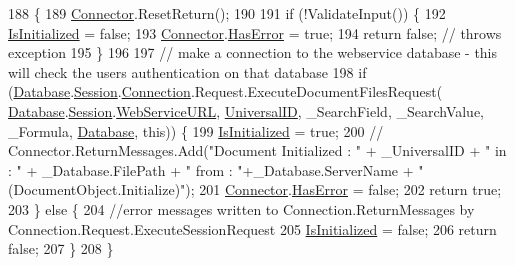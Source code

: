 \begin{DoxyCode}
188                                       \{
189         \mbox{\hyperlink{class_connector}{Connector}}.ResetReturn();
190 
191         \textcolor{keywordflow}{if} (!ValidateInput()) \{
192             \mbox{\hyperlink{class_document_object_a3b2075b73f38d05091b69decc6ce7992}{IsInitialized}} = \textcolor{keyword}{false};
193             \mbox{\hyperlink{class_connector}{Connector}}.\mbox{\hyperlink{class_connector_a9365777a6b7b711b75bcfa6c4d53e989}{HasError}} = \textcolor{keyword}{true};
194             \textcolor{keywordflow}{return} \textcolor{keyword}{false};   \textcolor{comment}{// throws exception}
195         \}
196 
197         \textcolor{comment}{// make a connection to the webservice database - this will check the users authentication on that
       database}
198         \textcolor{keywordflow}{if} (\mbox{\hyperlink{class_document_object_a69d5338c9835f748490323d2950eed09}{Database}}.\mbox{\hyperlink{class_database_object_aa8484162b7d2a7c4c9426bca13c64c07}{Session}}.\mbox{\hyperlink{class_session_object_a014bdbf705a753540e19bfb53030c55c}{Connection}}.Request.ExecuteDocumentFilesRequest(
      \mbox{\hyperlink{class_document_object_a69d5338c9835f748490323d2950eed09}{Database}}.\mbox{\hyperlink{class_database_object_aa8484162b7d2a7c4c9426bca13c64c07}{Session}}.\mbox{\hyperlink{class_session_object_a697c071c812fbf7ad1166b896fb44c16}{WebServiceURL}}, \mbox{\hyperlink{class_document_object_a8b96d04632a2802e7cc5466ca5cee8cf}{UniversalID}}, \_SearchField, 
      \_SearchValue, \_Formula, \mbox{\hyperlink{class_document_object_a69d5338c9835f748490323d2950eed09}{Database}}, \textcolor{keyword}{this})) \{
199             \mbox{\hyperlink{class_document_object_a3b2075b73f38d05091b69decc6ce7992}{IsInitialized}} = \textcolor{keyword}{true};
200             \textcolor{comment}{//  Connector.ReturnMessages.Add("Document Initialized : " + \_UniversalID + " in : " +
       \_Database.FilePath + " from : "+\_Database.ServerName + " (DocumentObject.Initialize)");}
201             \mbox{\hyperlink{class_connector}{Connector}}.\mbox{\hyperlink{class_connector_a9365777a6b7b711b75bcfa6c4d53e989}{HasError}} = \textcolor{keyword}{false};
202             \textcolor{keywordflow}{return} \textcolor{keyword}{true};
203         \} \textcolor{keywordflow}{else} \{
204             \textcolor{comment}{//error messages written to Connection.ReturnMessages by
       Connection.Request.ExecuteSessionRequest}
205             \mbox{\hyperlink{class_document_object_a3b2075b73f38d05091b69decc6ce7992}{IsInitialized}} = \textcolor{keyword}{false};
206             \textcolor{keywordflow}{return} \textcolor{keyword}{false};
207         \}
208     \}
\end{DoxyCode}


